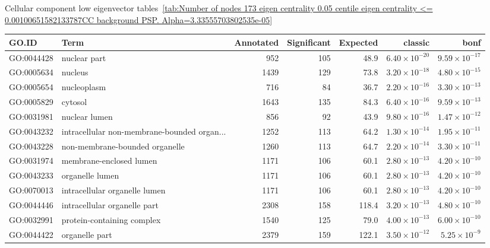 Cellular component low eigenvector
tables~\ref{tab:Number of nodes 173 eigen centrality 0.05 centile  eigen centrality <= 0.00100651582133787CC background PSP. Alpha=3.33555703802535e-05}





\begin{table}[ht]
\centering
\begin{adjustbox}{max width=\textwidth}
\begin{tabular}{llrrrrr}
  \hline
GO.ID & Term & Annotated & Significant & Expected & classic & bonf \\ 
  \hline
GO:0044428 & nuclear part & 952 & 105 & 48.9 & $6.40 \times 10^{-20}$ & $9.59 \times 10^{-17}$ \\ 
  GO:0005634 & nucleus & 1439 & 129 & 73.8 & $3.20 \times 10^{-18}$ & $4.80 \times 10^{-15}$ \\ 
  GO:0005654 & nucleoplasm & 716 & 84 & 36.7 & $2.20 \times 10^{-16}$ & $3.30 \times 10^{-13}$ \\ 
  GO:0005829 & cytosol & 1643 & 135 & 84.3 & $6.40 \times 10^{-16}$ & $9.59 \times 10^{-13}$ \\ 
  GO:0031981 & nuclear lumen & 856 & 92 & 43.9 & $9.80 \times 10^{-16}$ & $1.47 \times 10^{-12}$ \\ 
  GO:0043232 & intracellular non-membrane-bounded organ... & 1252 & 113 & 64.2 & $1.30 \times 10^{-14}$ & $1.95 \times 10^{-11}$ \\ 
  GO:0043228 & non-membrane-bounded organelle & 1260 & 113 & 64.7 & $2.20 \times 10^{-14}$ & $3.30 \times 10^{-11}$ \\ 
  GO:0031974 & membrane-enclosed lumen & 1171 & 106 & 60.1 & $2.80 \times 10^{-13}$ & $4.20 \times 10^{-10}$ \\ 
  GO:0043233 & organelle lumen & 1171 & 106 & 60.1 & $2.80 \times 10^{-13}$ & $4.20 \times 10^{-10}$ \\ 
  GO:0070013 & intracellular organelle lumen & 1171 & 106 & 60.1 & $2.80 \times 10^{-13}$ & $4.20 \times 10^{-10}$ \\ 
  GO:0044446 & intracellular organelle part & 2308 & 158 & 118.4 & $3.20 \times 10^{-13}$ & $4.80 \times 10^{-10}$ \\ 
  GO:0032991 & protein-containing complex & 1540 & 125 & 79.0 & $4.00 \times 10^{-13}$ & $6.00 \times 10^{-10}$ \\ 
  GO:0044422 & organelle part & 2379 & 159 & 122.1 & $3.50 \times 10^{-12}$ & $5.25 \times 10^{-9}$ \\ 

\end{tabular}
\end{adjustbox}
\end{table}
